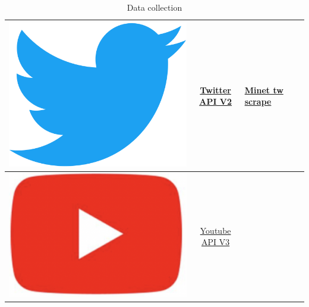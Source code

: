 \documentclass{article}
\begin{document}
\begin{table}[]
\begin{tabular}{|l|c|l|l|l}
 \includegraphics[scale=0.007]{./img/tw_logo.png}  &  \href{https://developer.twitter.com/en/docs/twitter-api/early-access}{Twitter API V2} & \multicolumn{1}{l|}{\href{https://github.com/medialab/minet/blob/master/docs/cli.md\#twitter-scrape}{Minet tw scrape}}                                                                                                                                                                           \\ \hline
 \includegraphics[scale=0.03]{./img/yt_logo.png}  &  \href{https://developers.google.com/youtube/v3}{Youtube API V3}      &                                                                                                                            \multicolumn{1}{l|}{}                                                                                                                                                                           \\ \hline
\end{tabular}
\caption{Data collection}
\label{tab1}
\end{table}
\end{document}
